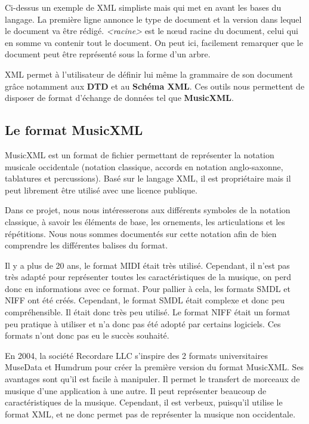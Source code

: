 \par
Ci-dessus un exemple de XML simpliste mais qui met en avant les bases du langage. La première ligne annonce le type de document et la version dans lequel le document va être rédigé. \emph{<racine>} est le nœud racine du document, celui qui en somme va contenir tout le document. On peut ici, facilement remarquer que le document peut être représenté sous la forme d'un arbre.

\par
XML permet à l'utilisateur de définir lui même la grammaire de son document grâce notamment aux \textbf{DTD} et au \textbf{Schéma XML}. Ces outils nous permettent de disposer de format d’échange de données tel que \textbf{MusicXML}.



\subsection{Le format MusicXML}

MusicXML \cite{musicxml} est un format de fichier permettant de représenter la notation musicale occidentale (notation classique, accords en notation anglo-saxonne, tablatures et percussions). Basé sur le langage XML, il est propriétaire mais il peut librement être utilisé avec une licence publique.

\par
Dans ce projet, nous nous intéresserons aux différents symboles de la notation classique, à savoir les éléments de base, les ornements, les articulations et les répétitions. Nous nous sommes documentés sur cette notation \cite{apprendre_solfege} afin de bien comprendre les différentes balises du format.


\par
Il y a plus de 20 ans, le format MIDI était très utilisé. Cependant, il n’est pas très adapté pour représenter toutes les caractéristiques de la musique, on perd donc en informations avec ce format. Pour pallier à cela, les formats SMDL et NIFF ont été créés. Cependant, le format SMDL était complexe et donc peu compréhensible. Il était donc très peu utilisé. Le format NIFF était un format peu pratique à utiliser et n’a donc pas été adopté par certains logiciels. Ces formats n’ont donc pas eu le succès souhaité.

\par
En 2004, la société Recordare LLC s’inspire des 2 formats universitaires MuseData et Humdrum pour créer la première version du format MusicXML. Ses avantages sont qu’il est facile à manipuler. Il permet le transfert de morceaux de musique d’une application à une autre. Il peut représenter beaucoup de caractéristiques de la musique. Cependant, il est verbeux, puisqu'il utilise le format XML, et ne donc permet pas de représenter la musique non occidentale.

